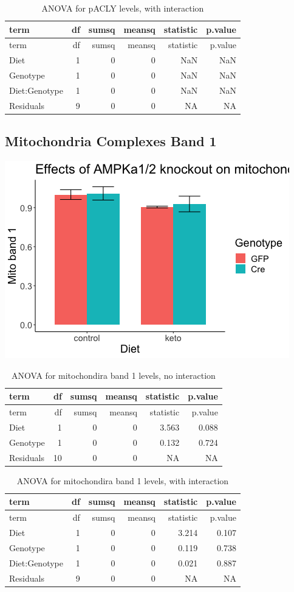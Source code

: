 \documentclass[
]{article}
\begin{document}
\begin{longtable}[]{@{}lrrrrr@{}}
\caption{ANOVA for pACLY levels, with interaction}\tabularnewline
\toprule
term & df & sumsq & meansq & statistic & p.value\tabularnewline
\midrule
\endfirsthead
\toprule
term & df & sumsq & meansq & statistic & p.value\tabularnewline
\midrule
\endhead
Diet & 1 & 0 & 0 & NaN & NaN\tabularnewline
Genotype & 1 & 0 & 0 & NaN & NaN\tabularnewline
Diet:Genotype & 1 & 0 & 0 & NaN & NaN\tabularnewline
Residuals & 9 & 0 & 0 & NA & NA\tabularnewline
\bottomrule
\end{longtable}

\hypertarget{mitochondria-complexes-band-1}{%
\subsection{Mitochondria Complexes Band
1}\label{mitochondria-complexes-band-1}}

\includegraphics{figures/mitoband1-barplot-1.png}

\begin{longtable}[]{@{}lrrrrr@{}}
\caption{ANOVA for mitochondira band 1 levels, no
interaction}\tabularnewline
\toprule
term & df & sumsq & meansq & statistic & p.value\tabularnewline
\midrule
\endfirsthead
\toprule
term & df & sumsq & meansq & statistic & p.value\tabularnewline
\midrule
\endhead
Diet & 1 & 0 & 0 & 3.563 & 0.088\tabularnewline
Genotype & 1 & 0 & 0 & 0.132 & 0.724\tabularnewline
Residuals & 10 & 0 & 0 & NA & NA\tabularnewline
\bottomrule
\end{longtable}

\begin{longtable}[]{@{}lrrrrr@{}}
\caption{ANOVA for mitochondira band 1 levels, with
interaction}\tabularnewline
\toprule
term & df & sumsq & meansq & statistic & p.value\tabularnewline
\midrule
\endfirsthead
\toprule
term & df & sumsq & meansq & statistic & p.value\tabularnewline
\midrule
\endhead
Diet & 1 & 0 & 0 & 3.214 & 0.107\tabularnewline
Genotype & 1 & 0 & 0 & 0.119 & 0.738\tabularnewline
Diet:Genotype & 1 & 0 & 0 & 0.021 & 0.887\tabularnewline
Residuals & 9 & 0 & 0 & NA & NA\tabularnewline
\bottomrule
\end{longtable}
\end{document}
